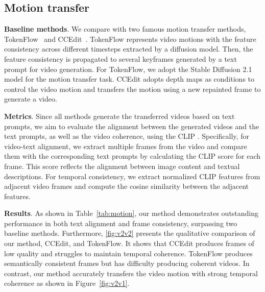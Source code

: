 \subsection{Motion transfer}



\noindent\textbf{Baseline methods}. We compare \methodname with two famous motion transfer methods, TokenFlow~\cite{tokenflow} and CCEdit~\cite{ccedit}. TokenFlow represents video motions with the feature consistency across different timesteps extracted by a diffusion model. Then, the feature consistency is propagated to several keyframes generated by a text prompt for video generation. For TokenFlow, we adopt the Stable Diffusion 2.1~\cite{rombach2022high} model for the motion transfer task. CCEdit adopts depth maps as conditions to control the video motion and transfers the motion using a new repainted frame to generate a video. 

\noindent\textbf{Metrics}. 
Since all methods generate the transferred videos based on text prompts, we aim to evaluate the alignment between the generated videos and the text prompts, as well as the video coherence, using the CLIP \cite{radford2021learningtransferablevisualmodels}. Specifically, for video-text alignment, we extract multiple frames from the video and compare them with the corresponding text prompts by calculating the CLIP score \cite{hessel2022clipscorereferencefreeevaluationmetric} for each frame. This score reflects the alignment between image content and textual descriptions. For temporal consistency, we extract normalized CLIP features from adjacent video frames and compute the cosine similarity between the adjacent features. 

\noindent\textbf{Results}. As shown in Table~\ref{tab:motion}, our method demonstrates outstanding performance in both text alignment and frame consistency, surpassing two baseline methods. Furthermore, \autoref{fig:v2v2} presents the qualitative comparison of our method, CCEdit, and TokenFlow. It shows that CCEdit produces frames of low quality and struggles to maintain temporal coherence. TokenFlow produces semantically consistent frames but has difficulty producing coherent videos. In contrast, our method accurately transfers the video motion with strong temporal coherence as shown in Figure~\ref{fig:v2v1}. 

